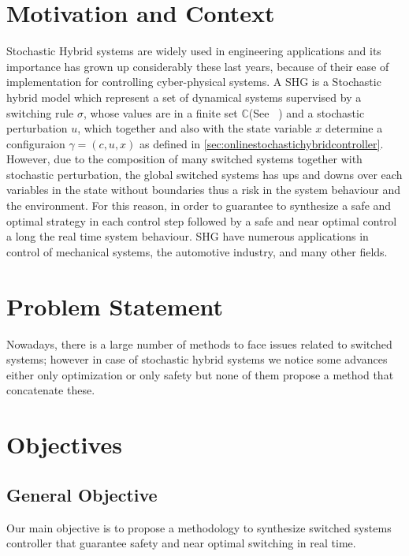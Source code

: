     \section{Motivation and Context}
    \label{sec:motivation}

    Stochastic Hybrid systems are widely used in engineering 
    applications and its importance has grown up considerably 
    these last years, because of their ease of implementation 
    for controlling cyber-physical systems. A \ac{SHG} is a Stochastic 
    hybrid model which represent a set of dynamical systems supervised by 
    a switching rule $\sigma$, whose values are in a finite set 
    $\mathbb{C}$(See ~\cite{liberzon2003switching}) and a stochastic
    perturbation $u$, which together and also with the state variable $x$
    determine a configuraion $\gamma = (c,u,x)$ as defined in 
    \autoref{sec:onlinestochastichybridcontroller}. However, due to 
    the composition of many switched systems together with stochastic 
    perturbation, the global switched systems has ups and downs
    over each variables in the state without boundaries thus a risk
    in the system behaviour and the environment. For this reason,
    in order to guarantee to synthesize a safe and optimal strategy
    in each control step followed by a safe and near optimal control
    a long the real time system behaviour. \ac{SHG} have numerous applications 
    in control of mechanical systems, the automotive industry, and 
    many other fields. 
    
    \section{Problem Statement}
    \label{sec:problem}
    Nowadays, there is a large number of methods to face issues related 
    to switched systems; however in case of stochastic hybrid systems 
     we notice some advances either only optimization or only safety
     but none of them propose a method that concatenate these. 
    
    \section{Objectives}
    \label{sec:objectives}

        \subsection*{General Objective}
        Our main objective is to propose a methodology to synthesize switched 
        systems controller that guarantee safety and near optimal switching
        in real time. 

